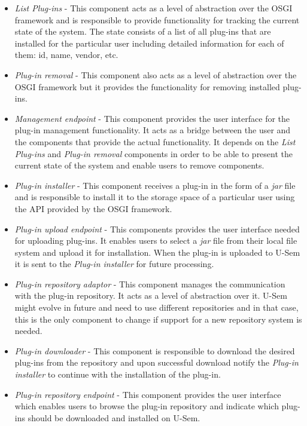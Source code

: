 \begin{itemize}

\item \textit{List Plug-ins} - This component acts as a level of abstraction over the OSGI framework and is responsible to provide functionality for tracking the current state of the system. The state consists of a list of all plug-ins that are installed for the particular user including detailed information for each of them: id, name, vendor, etc.

\item \textit{Plug-in removal} - This component also acts as a level of abstraction over the OSGI framework but it provides the functionality for removing installed plug-ins.

\item \textit{Management endpoint} - This component provides the user interface for the plug-in management functionality. It acts as a bridge between the user and the components that provide the actual functionality. It depends on the \textit{List Plug-ins} and \textit{Plug-in removal} components in order to be able to present the current state of the system and enable users to remove components.

\item \textit{Plug-in installer} - This component receives a plug-in in the form of a \textit{jar} file and is responsible to install it to the storage space of a particular user using the API provided by the OSGI framework.

\item \textit{Plug-in upload endpoint} - This components provides the user interface needed for uploading plug-ins. It enables users to select a \textit{jar} file from their local file system and upload it for installation. When the plug-in is uploaded to U-Sem it is sent to the \textit{Plug-in installer} for future processing.

\item \textit{Plug-in repository adaptor} - This component manages  the communication with the plug-in repository. It acts as a level of abstraction over it. U-Sem might evolve in future and need to use different repositories and in that case, this is the only component to change if support for a new repository system is needed. 

\item \textit{Plug-in downloader} - This component is responsible to download the desired plug-ins from the repository and upon successful download notify the \textit{Plug-in installer} to continue with the installation of the plug-in.

\item \textit{Plug-in repository endpoint} - This component provides the user interface which enables users to browse the plug-in repository and indicate which plug-ins should be downloaded and installed on U-Sem.

\end{itemize}


